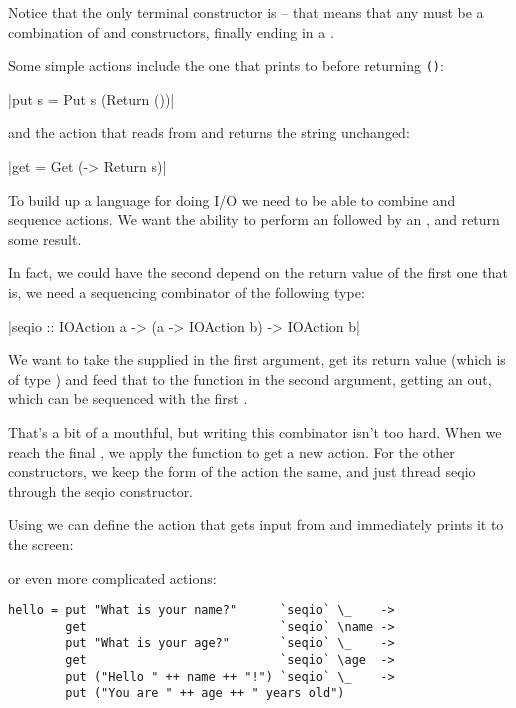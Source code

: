\documentclass[thesis-solanki.tex]{subfiles}
\begin{document}
Notice that the only terminal constructor is  --
that means that any  must be a combination of  and  constructors, 
finally ending in a .

Some simple actions include the one that prints to  before returning \Verb!()!:

|put s = Put s (Return ())|

and the action that reads from  and returns the string unchanged:

|get = Get (\s -> Return s)|

To build up a language for doing I/O we need to be able to combine and sequence actions. We want the ability to perform an   
followed by an  , and return some result.

In fact, we could have the second  depend on the return value of the first one 
that is, we need a sequencing combinator of the 
following type:

|seqio :: IOAction a -> (a -> IOAction b) -> IOAction b|

We want to take the   supplied in the first argument, get its return value (which is of type ) and feed that to the function in 
the second argument, getting an   out, which can be sequenced with the first  .

That's a bit of a mouthful, but writing this combinator isn't too hard. When we reach the final , we apply the function  to get a 
new action. For the other constructors, we keep the form of the action the same, and just thread seqio through the seqio constructor.

Using  we can define the action that gets input from  and immediately prints it to
the screen: 


or even more complicated actions:

\begin{code-list}[H]
\begin{singlespace}
\begin{verbatim}
hello = put "What is your name?"      `seqio` \_    ->
        get                           `seqio` \name ->
        put "What is your age?"       `seqio` \_    ->
        get                           `seqio` \age  ->
        put ("Hello " ++ name ++ "!") `seqio` \_    ->
        put ("You are " ++ age ++ " years old")
\end{verbatim}
\end{singlespace}
\caption{}
\label{}
\end{code-list}
\end{document}
